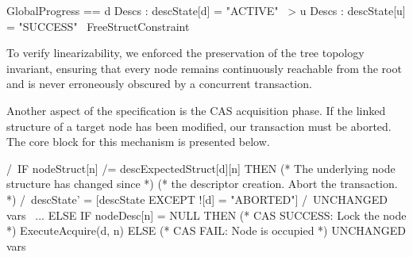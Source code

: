 \begin{tla}
GlobalProgress ==
  \E d \in Descs : descState[d] = "ACTIVE" ~>
    \E u \in Descs : descState[u] = "SUCCESS"
      \/ ~FreeStructConstraint
\end{tla}
\begin{tlatex}
%
%
%
\end{tlatex}

To verify linearizability, we enforced the preservation of the tree topology invariant, ensuring that every node remains continuously reachable from the root and is never erroneously obscured by a concurrent transaction.

Another aspect of the specification is the CAS acquisition phase. If the linked structure of a target node has been modified, our transaction must be aborted. The core block for this mechanism is presented below.

\begin{tla}
/\ IF nodeStruct[n] /= descExpectedStruct[d][n]
  THEN (* The underlying node structure has changed since *)
       (* the descriptor creation. Abort the transaction. *)
    /\ descState' = [descState EXCEPT ![d] = "ABORTED"]
    /\ UNCHANGED vars \ {...}
  ELSE IF nodeDesc[n] = NULL
  THEN (* CAS SUCCESS: Lock the node *)
    ExecuteAcquire(d, n)
  ELSE (* CAS FAIL: Node is occupied *)
    UNCHANGED vars
\end{tla}
\begin{tlatex}
%
%
\@xx{}%
%
%
\@xx{}%
%
%
%
%
\@xx{}%
%
%
%
\@xx{}%
%
\end{tlatex}
